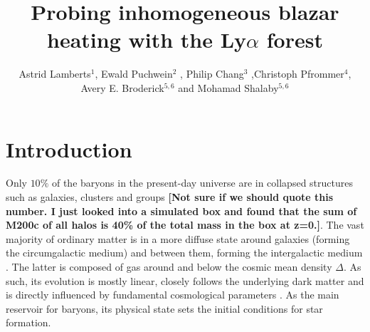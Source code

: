 \documentclass[numberedappendix]{emulateapj}
\newcommand\Ec[1]{{\color{magenta} \bf #1}} %
\begin{document}
\title{Probing inhomogeneous blazar heating with the Ly$\alpha$ forest}
\author{Astrid Lamberts$^1$,  Ewald Puchwein$^2$ , Philip Chang$^3$ ,Christoph Pfrommer$^4$, Avery E. Broderick$^{5,6}$ and Mohamad Shalaby$^{5,6}$}
\begin{abstract}

\end{abstract}
\keywords{}
\section{Introduction}

Only $10\%$ of the baryons in the present-day universe are in collapsed structures such as galaxies, clusters and groups \citep{2012ApJ...759...23S} \Ec{[Not sure if we should quote this number. I just looked into a simulated box and found that the sum of M200c of all halos is 40\% of the total mass in the box at z=0.]}. The vast majority of ordinary matter is in a more diffuse state around galaxies (forming the circumgalactic medium) and  between them, forming the intergalactic medium \citep[IGM, see][for a recent review]{2016ARA&A..54..313M}. The latter is composed of gas around  and below the cosmic mean density $\Delta$. As such, its evolution is mostly linear, closely follows the underlying dark matter and is directly influenced by fundamental cosmological parameters \citep{2013A&A...559A..85P,2013JCAP...04..026S,2015JCAP...11..011P}.  As the main reservoir for baryons,  its physical state sets the initial conditions for star formation.
\end{document}
